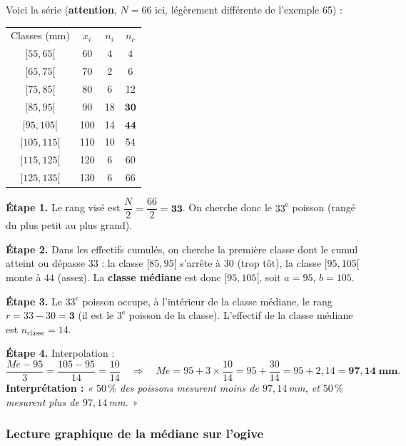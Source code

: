 \documentclass[11pt,a4paper]{article}
\newcommand{\med}{M\!e}                  %
\begin{document}
\begin{exemple}
Voici la série (\textbf{attention}, $N=66$ ici, légèrement différente de l'exemple 65) :
\begin{center}
\renewcommand{\arraystretch}{1.15}
\begin{tabular}{c c c c}
\rowcolor{primary!18}
Classes (mm) & $x_i$ & $n_i$ & $n_c$ \\
$[55,65[$  & 60  & 4  & 4 \\
$[65,75[$  & 70  & 2  & 6 \\
$[75,85[$  & 80  & 6  & 12 \\
$[85,95[$  & 90  & 18 & $\mathbf{30}$ \\
$[95,105[$ & 100 & 14 & $\mathbf{44}$ \\
$[105,115[$& 110 & 10 & 54 \\
$[115,125[$& 120 & 6  & 60 \\
$[125,135[$& 130 & 6  & 66 \\
\end{tabular}
\end{center}

\textbf{Étape 1.} Le rang visé est $\dfrac{N}{2}=\dfrac{66}{2}=\mathbf{33}$. On cherche donc le
$33^{\text{e}}$ poisson (rangé du plus petit au plus grand).

\textbf{Étape 2.} Dans les effectifs cumulés, on cherche la première classe dont le cumul atteint ou
dépasse $33$ : la classe $[85,95[$ s'arrête à $30$ (trop tôt), la classe $[95,105[$ monte à $44$
(assez). La \textbf{classe médiane} est donc $[95,105[$, soit $a=95$, $b=105$.

\textbf{Étape 3.} Le $33^{\text{e}}$ poisson occupe, à l'intérieur de la classe médiane, le rang
$r=33-30=\mathbf{3}$ (il est le $3^{\text{e}}$ poisson de la classe). L'effectif de la classe médiane
est $n_{\text{classe}}=14$.

\textbf{Étape 4.} Interpolation :
\[
\frac{\med-95}{3}=\frac{105-95}{14}=\frac{10}{14}
\quad\Longrightarrow\quad
\med=95+3\times\frac{10}{14}=95+\frac{30}{14}=95+2{,}14=\mathbf{97{,}14\;\text{mm}}.
\]
\textbf{Interprétation :} \emph{« $50\,\%$ des poissons mesurent moins de $97{,}14$\,mm, et $50\,\%$
mesurent plus de $97{,}14$\,mm. »}
\end{exemple}

\subsubsection{Lecture graphique de la médiane sur l'ogive}
\end{document}
